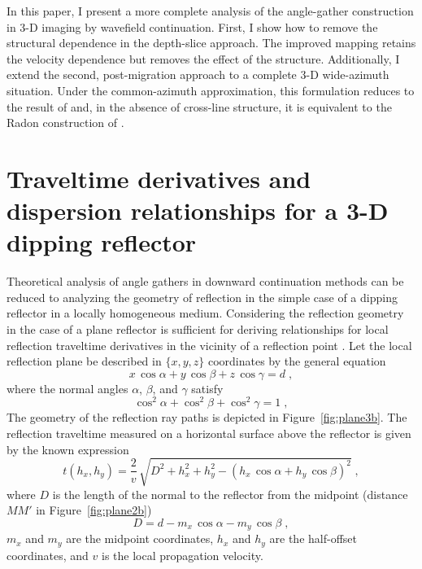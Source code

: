 In this paper, I present a more complete analysis of the angle-gather
construction in 3-D imaging by wavefield continuation. First, I show how to
remove the structural dependence in the depth-slice approach. The improved
mapping retains the velocity dependence but removes 
the effect of the structure. Additionally, I extend the second, post-migration
approach to a complete 3-D wide-azimuth situation.  Under the common-azimuth
approximation, this formulation reduces to the result of \cite{newseg}
and, in the absence of cross-line structure, it is equivalent to the Radon
construction of \cite{GEO68-03-10651074}. 

\section{Traveltime derivatives and dispersion relationships for a
  3-D dipping reflector}

Theoretical analysis of angle gathers in downward continuation methods can be
reduced to analyzing the geometry of reflection in the simple case of a
dipping reflector in a locally homogeneous medium. Considering the reflection
geometry in the case of a plane reflector is sufficient for deriving
relationships for local reflection traveltime derivatives in the vicinity of a
reflection point \cite[]{goldin}. Let the local reflection plane be described in
$\{x,y,z\}$ coordinates by the general equation
\begin{equation}
  \label{eq:plane}
  x\,\cos{\alpha} + y\,\cos{\beta} + z\,\cos{\gamma} = d\;,
\end{equation}
where the normal angles $\alpha$, $\beta$, and $\gamma$ satisfy
\begin{equation}
  \label{eq:norm}
  \cos^2{\alpha} + \cos^2{\beta} + \cos^2{\gamma} = 1\;,
\end{equation}
The geometry of the reflection ray paths is depicted in
Figure~\ref{fig:plane3b}.  The reflection traveltime measured on a
horizontal surface above the reflector is given by the known expression
\cite[]{LSC00-00-02680268,GEO36-03-05100516}
\begin{equation}
  \label{eq:ttime}
  t(h_x,h_y) =
  \frac{2}{v}\,\sqrt{D^2+h_x^2+h_y^2-
    \left(h_x\,\cos{\alpha} + h_y\,\cos{\beta}\right)^2}\;,
\end{equation}
where $D$ is the length of the normal to the reflector from the
midpoint (distance $MM'$ in Figure~\ref{fig:plane2b})
\begin{equation}
  \label{eq:dmm}
  D = d - m_x\,\cos{\alpha} - m_y\,\cos{\beta}\;,
\end{equation}
$m_x$ and $m_y$ are the midpoint coordinates, $h_x$ and $h_y$ are the
half-offset coordinates, and $v$ is the local propagation velocity.

